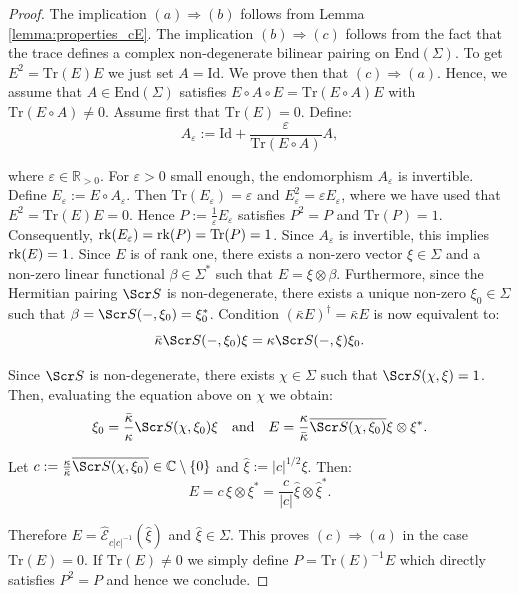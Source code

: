 \documentclass[10pt,a4paper,twoside,reqno]{amsart}
\theoremstyle{plain}
\theoremstyle{definition}
\theoremstyle{remark}
\newcommand{\End}{\mathrm{End}}
\def\C{\mathbb{C}}
\def\R{\mathbb{R}}
\def\rk{{\rm rk}}
\def\Id{\mathrm{Id}}
\newcommand{\Tr}{\mathrm{Tr}}
\def\scS{\Scr S}
\def\hcE{\widehat{\mathcal{E}}}
\def\R{\mathbb{R}}
\newcommand{\abs}[1]{\left\lvert#1\right\rvert}
\begin{document}
\begin{proof}
The implication $(a) \Rightarrow (b)$ follows from Lemma \ref{lemma:properties_cE}. The implication $(b) \Rightarrow (c)$ follows from the fact that the trace defines a complex non-degenerate bilinear pairing on $\End(\Sigma)$. To get $E^2=\Tr(E)E$ we just set $A=\Id$. We prove then that $(c) \Rightarrow (a)$. Hence, we assume that $A\in\End(\Sigma)$ satisfies $E\circ A\circ E=\Tr(E\circ A)E$ with $\Tr(E\circ A)\neq0$. Assume first that $\Tr(E) = 0$. Define:
\begin{equation*}
A_\varepsilon:=\Id+\frac{\varepsilon}{\Tr(E\circ A)}A,
\end{equation*}

\noindent
where $\varepsilon\in\R_{>0}$. For $\varepsilon>0$ small enough, the endomorphism $A_\varepsilon$ is invertible. Define $E_\varepsilon:=E\circ A_\varepsilon$. Then $\Tr(E_\varepsilon)=\varepsilon$ and $E_\varepsilon^2=\varepsilon E_\varepsilon$, where we have used that $E^2=\Tr(E)E=0$. Hence $P:=\frac{1}{\varepsilon}E_\varepsilon$ satisfies $P^2=P$ and $\Tr(P)=1$. Consequently, $\rk(E_\varepsilon)=\rk(P)=\Tr(P)=1$. Since $A_\varepsilon$ is invertible, this implies $\rk(E)=1$. Since $E$ is of rank one, there exists a non-zero vector $\xi\in\Sigma$ and a non-zero linear functional $\beta\in\Sigma^*$ such that $E=\xi\otimes\beta$. Furthermore, since the Hermitian pairing $\scS$ is non-degenerate, there exists a unique non-zero $\xi_0\in\Sigma$ such that $\beta = \scS(-,\xi_0) = \xi_0^*$. Condition $(\bar\kappa E)^\dagger = \bar\kappa E$ is now equivalent to:
\begin{equation*}
\bar\kappa\scS(-,\xi_0)\xi=\kappa\scS(-,\xi)\xi_0.
\end{equation*}

\noindent
Since $\scS$ is non-degenerate, there exists $\chi \in\Sigma$ such that $\scS(\chi,\xi)=1$. Then, evaluating the equation above on $\chi$ we obtain: 
\begin{equation*}
\xi_0=\frac{\bar\kappa}{\kappa}\scS(\chi,\xi_0)\xi\quad\text{and}\quad E=\frac{\kappa}{\bar\kappa}\overline{\scS(\chi,\xi_0)}\xi\otimes\xi^*.
\end{equation*}

\noindent
Let $c:=\frac{\kappa}{\bar\kappa}\overline{\scS(\chi,\xi_0)}\in\C\setminus\{0\}$ and $\hat\xi:=\abs{c}^{1/2}\xi$. Then: 
\begin{equation*}
E=c\, \xi\otimes\xi^{\ast}=\frac{c}{\abs{c}}\hat\xi\otimes\hat\xi^*.
\end{equation*}

\noindent
Therefore $E=\hcE_{c\abs{c}^{-1}}(\hat\xi)$ and $\hat\xi\in\Sigma$. This proves $(c) \Rightarrow (a)$ in the case $\Tr(E) = 0$. If $\Tr(E) \neq 0$ we simply define $P = \Tr(E)^{-1} E$ which directly satisfies $P^2=P$ and hence we conclude.
\end{proof}
\end{document}
